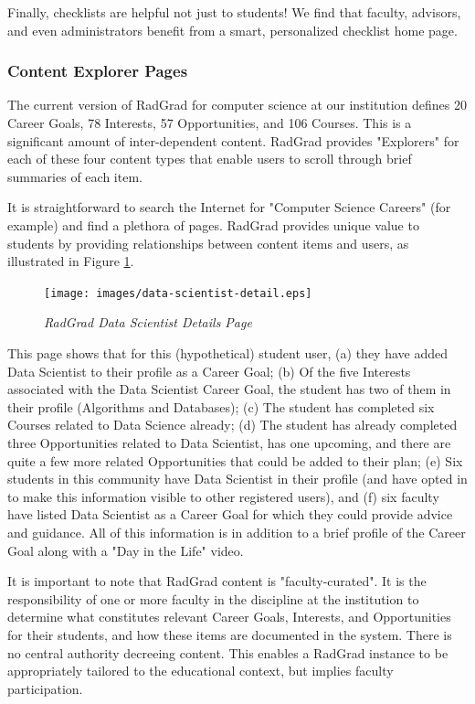 \documentclass[acmsmall]{acmart}
\begin{document}
Finally, checklists are helpful not just to students!  We find that faculty, advisors, and even administrators benefit from a smart, personalized checklist home page.

\subsubsection{Content Explorer Pages}

The current version of RadGrad for computer science at our institution defines 20 Career Goals, 78 Interests, 57 Opportunities, and 106 Courses. This is a significant amount of inter-dependent content.  RadGrad provides "Explorers" for each of these four content types that enable users to scroll through brief summaries of each item.

It is straightforward to search the Internet for "Computer Science Careers" (for example) and find a plethora of pages. RadGrad provides unique value to students by providing relationships between content items and users, as illustrated in Figure \ref{fig:radgrad-data-scientist-detail}.

\begin{figure}[ht]
\centering
\texttt{[image: images/data-scientist-detail.eps]}
\caption{\em RadGrad Data Scientist Details Page}
\label{fig:radgrad-data-scientist-detail}
\end{figure}

This page shows that for this (hypothetical) student user, (a) they have added Data Scientist to their profile as a Career Goal; (b) Of the five Interests associated with the Data Scientist Career Goal, the student has two of them in their profile (Algorithms and Databases); (c) The student has completed six Courses related to Data Science already; (d) The student has already completed three Opportunities related to Data Scientist, has one upcoming, and there are quite a few more related Opportunities that could be added to their plan; (e) Six students in this community have Data Scientist in their profile (and have opted in to make this information visible to other registered users), and (f) six faculty have listed Data Scientist as a Career Goal for which they could provide advice and guidance.  All of this information is in addition to a brief profile of the Career Goal along with a "Day in the Life" video.

It is important to note that RadGrad content is "faculty-curated".  It is the responsibility of one or more faculty in the discipline at the institution to determine what constitutes relevant Career Goals, Interests, and Opportunities for their students, and how these items are documented in the system. There is no central authority decreeing content. This enables a RadGrad instance to be appropriately tailored to the educational context, but implies faculty participation.
\end{document}
